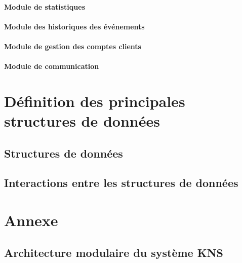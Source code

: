 \documentclass[10pt,a4paper]{report}
\begin{document}
	
	\paragraph{Module de statistiques}

	
	\paragraph{Module des historiques des événements}
	
	
	\paragraph{Module de gestion des comptes clients}
	
	
	\paragraph{Module de communication}

\section{Définition des principales structures de données}

\subsection{Structures de données}

\subsection{Interactions entre les structures de données} %

\newpage
\section{Annexe}

\subsection{Architecture modulaire du système KNS}
	\begin{center}
	\end{center}
\end{document}
